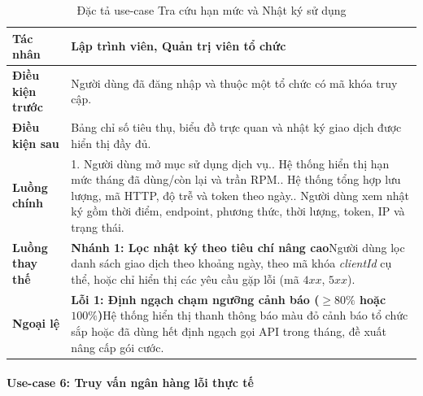 \begingroup
\small
\begin{longtable}{|p{3.2cm}|p{\dimexpr\linewidth-3.2cm-4\tabcolsep-3\arrayrulewidth\relax}|}
\caption{Đặc tả use-case Tra cứu hạn mức và Nhật ký sử dụng}
\label{aihub:tab:uc_view_usage_logs}\\
\hline
\textbf{Tác nhân} & Lập trình viên, Quản trị viên tổ chức \\ \hline
\textbf{Điều kiện trước} & Người dùng đã đăng nhập và thuộc một tổ chức có mã khóa truy cập. \\ \hline
\textbf{Điều kiện sau} & Bảng chỉ số tiêu thụ, biểu đồ trực quan và nhật ký giao dịch được hiển thị đầy đủ. \\ \hline
\textbf{Luồng chính} & 1. Người dùng mở mục sử dụng dịch vụ.\newline 2. Hệ thống hiển thị hạn mức tháng đã dùng/còn lại và trần RPM.\newline 3. Hệ thống tổng hợp lưu lượng, mã HTTP, độ trễ và token theo ngày.\newline 4. Người dùng xem nhật ký gồm thời điểm, endpoint, phương thức, thời lượng, token, IP và trạng thái. \\ \hline
\textbf{Luồng thay thế} &
\textbf{Nhánh 1: Lọc nhật ký theo tiêu chí nâng cao}\newline Người dùng lọc danh sách giao dịch theo khoảng ngày, theo mã khóa \textit{clientId} cụ thể, hoặc chỉ hiển thị các yêu cầu gặp lỗi (mã $4xx$, $5xx$). \\ \hline
\textbf{Ngoại lệ} &
\textbf{Lỗi 1: Định ngạch chạm ngưỡng cảnh báo ($\ge 80\%$ hoặc $100\%$)}\newline Hệ thống hiển thị thanh thông báo màu đỏ cảnh báo tổ chức sắp hoặc đã dùng hết định ngạch gọi API trong tháng, đề xuất nâng cấp gói cước. \\ \hline
\end{longtable}
\endgroup


\paragraph{Use-case 6: Truy vấn ngân hàng lỗi thực tế}


